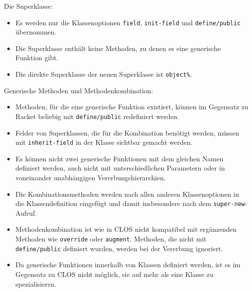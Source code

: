 Die Superklasse:
\begin{itemize}
 \item Es werden nur die Klassenoptionen \texttt{field}, \texttt{init-field} und \texttt{define/public} übernommen.
 \vspace{-0.3cm}
 \item Die Superklasse enthält keine Methoden, zu denen es eine generische Funktion gibt.
 \vspace{-0.3cm}
 \item Die direkte Superklasse der neuen Superklasse ist \texttt{object\%}.
\end{itemize}

Generische Methoden und Methodenkombination:
\begin{itemize}
 \item Methoden, für die eine generische Funktion existiert, können im Gegensatz zu Racket beliebig mit \texttt{define/public} redefiniert werden.
 \vspace{-0.3cm}
 \item Felder von Superklassen, die für die Kombination benötigt werden, müssen mit \texttt{inherit-field} in der Klasse sichtbar gemacht werden.
 \vspace{-0.3cm}
 \item Es können nicht zwei generische Funktionen mit dem gleichen Namen definiert werden, auch nicht mit unterschiedlichen Parametern oder in voneinander unabhängigen Vererbungshierarchien.
 \vspace{-0.3cm}
 \item Die Kombinationsmethoden werden nach allen anderen Klassenoptionen in die Klassendefinition eingefügt und damit insbesondere nach dem \texttt{super-new}-Aufruf.
 \vspace{-0.8cm}
 \item Methodenkombination ist wie in CLOS nicht kompatibel mit ergänzenden Methoden wie \texttt{override} oder \texttt{augment}. Methoden, die nicht mit \texttt{define/public} definiert wurden, werden bei der Vererbung ignoriert.
 \vspace{-0.3cm}
 \item Da generische Funktionen innerhalb von Klassen definiert werden, ist es im Gegensatz zu CLOS nicht möglich, sie auf mehr als eine Klasse zu spezialisieren.
\end{itemize}

